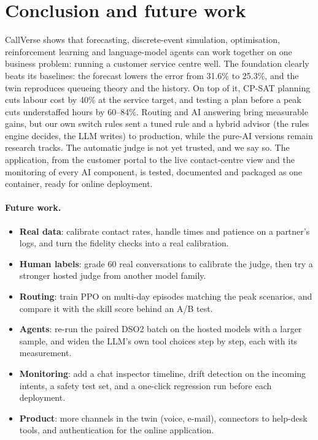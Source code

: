 \section{Conclusion and future work}
\label{sec:conclusion}

CallVerse shows that forecasting, discrete-event simulation, optimisation, reinforcement learning and
language-model agents can work together on one business problem: running a customer service centre well.
The foundation clearly beats its baselines: the forecast lowers the error from 31.6\% to 25.3\%, and the twin
reproduces queueing theory and the history. On top of it, CP-SAT planning cuts labour cost by 40\% at the
service target, and testing a plan before a peak cuts understaffed hours by 60--84\%. Routing and AI answering
bring measurable gains, but our own switch rules sent a tuned rule and a hybrid advisor (the rules engine
decides, the LLM writes) to production, while the pure-AI versions remain research tracks. The automatic judge
is not yet trusted, and we say so. The application, from the customer portal to the live contact-centre view
and the monitoring of every AI component, is tested, documented and packaged as one container, ready for online deployment.

\paragraph{Future work.}
\begin{itemize}
  \item \textbf{Real data}: calibrate contact rates, handle times and patience on a partner's logs, and turn the
        fidelity checks into a real calibration.
  \item \textbf{Human labels}: grade 60 real conversations to calibrate the judge, then try a stronger hosted
        judge from another model family.
  \item \textbf{Routing}: train PPO on multi-day episodes matching the peak scenarios, and compare it with the
        skill score behind an A/B test.
  \item \textbf{Agents}: re-run the paired DSO2 batch on the hosted models with a larger sample, and widen the
        LLM's own tool choices step by step, each with its measurement.
  \item \textbf{Monitoring}: add a chat inspector timeline, drift detection on the incoming intents, a safety
        test set, and a one-click regression run before each deployment.
  \item \textbf{Product}: more channels in the twin (voice, e-mail), connectors to help-desk tools, and
        authentication for the online application.
\end{itemize}
